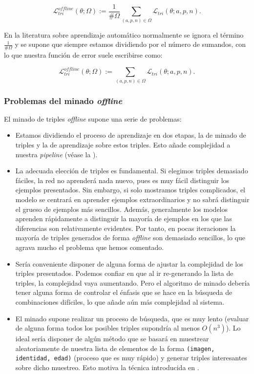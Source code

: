 \begin{equation}
	\mathcal{L}_{tri}^{offline}(\theta; \Omega) := \frac{1}{\#\Omega} \sum_{(a, p, n) \in \Omega} \mathcal{L}_{tri}(\theta; a, p, n).
\end{equation}

En la literatura sobre aprendizaje automático normalmente se ignora el término $\frac{1}{\#\Omega}$ y se supone que siempre estamos dividiendo por el número de sumandos, con lo que nuestra función de error suele escribirse como:

\begin{equation}
	\mathcal{L}_{tri}^{offline}(\theta; \Omega) := \sum_{(a, p, n) \in \Omega} \mathcal{L}_{tri}(\theta; a, p, n).
\end{equation}

\subsubsection{Problemas del minado \textit{offline}}

El minado de triples \textit{offline} supone una serie de problemas:

\begin{itemize}
	\item Estamos dividiendo el proceso de aprendizaje en dos etapas, la de minado de triples y la de aprendizaje sobre estos triples. Esto añade complejidad a nuestra \textit{pipeline} (véase la ).
	\item La adecuada elección de triples es fundamental. Si elegimos triples demasiado fáciles, la red no aprenderá nada nuevo, pues es muy fácil distinguir los ejemplos presentados. Sin embargo, si solo mostramos triples complicados, el modelo se centrará en aprender ejemplos extraordinarios y no sabrá distinguir el grueso de ejemplos más sencillos. Además, generalmente los modelos aprenden rápidamente a distinguir la mayoría de ejemplos en los que las diferencias son relativamente evidentes. Por tanto, en pocas iteraciones la mayoría de triples generados de forma \textit{offline} son demasiado sencillos, lo que agrava mucho el problema que hemos comentado.
	\item Sería conveniente disponer de alguna forma de ajustar la complejidad de los triples presentados. Podemos confiar en que al ir re-generando la lista de triples, la complejidad vaya aumentando. Pero el algoritmo de minado debería tener alguna forma de controlar el énfasis que se hace en la búsqueda de combinaciones difíciles, lo que añade aún más complejidad al sistema.
	\item El minado supone realizar un proceso de búsqueda, que es muy lento (evaluar de alguna forma todos los posibles triples supondría al menos $O(n^3)$). Lo ideal sería disponer de algún método que se basará en muestrear aleatoriamente de nuestra lista de elementos de la forma \lstinline{(imagen, identidad, edad)} (proceso que es muy rápido) y generar triples interesantes sobre dicho muestreo. Esto motiva la técnica introducida en .
\end{itemize}
